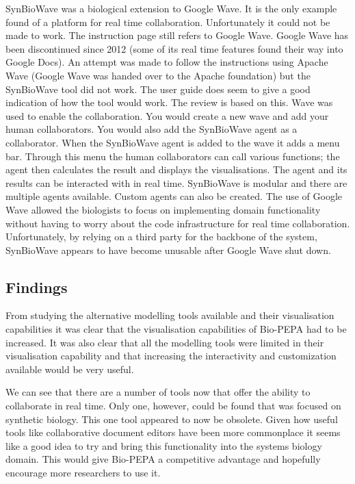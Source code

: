 SynBioWave was a biological extension to Google Wave.  It is the only example found of a platform for real time collaboration.  Unfortunately it could not be made to work.  The instruction page still refers to Google Wave.  Google Wave has been discontinued since 2012 (some of its real time features found their way into Google Docs).  An attempt was made to follow the instructions using Apache Wave (Google Wave was handed over to the Apache foundation) but the SynBioWave tool did not work.  The user guide does seem to give a good indication of how the tool would work.  The review is based on this.  Wave was used to enable the collaboration.  You would create a new wave and add your human collaborators.  You would also add the SynBioWave agent as a collaborator.   When the SynBioWave agent is added to the wave it adds a menu bar. Through this menu the human collaborators can call various functions; the agent then calculates the result and displays the visualisations.  The agent and its results can be interacted with in real time. SynBioWave is modular and there are multiple agents available.  Custom agents can also be created.  The use of Google Wave allowed the biologists to focus on implementing domain functionality without having to worry about the code infrastructure for real time collaboration.  Unfortunately, by relying on a third party for the backbone of the system, SynBioWave appears to have become unusable after Google Wave shut down.

\subsection{Findings}

From studying the alternative modelling tools available and their visualisation capabilities it was clear that the visualisation capabilities of Bio-PEPA had to be increased.  It was also clear that all the modelling tools were limited in their visualisation capability and that increasing the interactivity and customization available would be very useful.

We can see that there are a number of tools now that offer the ability to collaborate in real time.  Only one, however, could be found that was focused on synthetic biology.  This one tool appeared to now be obsolete.  Given how useful tools like collaborative document editors have been more commonplace it seems like a good idea to try and bring this functionality into the systems biology domain.  This would give Bio-PEPA a competitive advantage and hopefully encourage more researchers to use it.

